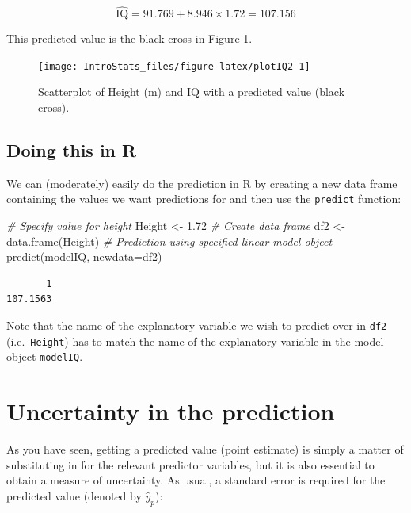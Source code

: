 \documentclass[
  oneside]{krantz}
\newenvironment{Shaded}{\begin{snugshade}}{\end{snugshade}}
\newcommand{\AttributeTok}[1]{\textcolor[rgb]{0.77,0.63,0.00}{#1}}
\newcommand{\CommentTok}[1]{\textcolor[rgb]{0.56,0.35,0.01}{\textit{#1}}}
\newcommand{\FloatTok}[1]{\textcolor[rgb]{0.00,0.00,0.81}{#1}}
\newcommand{\FunctionTok}[1]{\textcolor[rgb]{0.00,0.00,0.00}{#1}}
\newcommand{\NormalTok}[1]{#1}
\newcommand{\OtherTok}[1]{\textcolor[rgb]{0.56,0.35,0.01}{#1}}
\begin{document}
\[\hat {\textrm{IQ}} =91.769 + 8.946 \times 1.72 = 107.156\]

This predicted value is the black cross in Figure \ref{fig:plotIQ2}.

\begin{figure}

{\centering \texttt{[image: IntroStats\_files/figure-latex/plotIQ2-1]} 

}

\caption{Scatterplot of Height (m) and IQ with a predicted value (black cross).}\label{fig:plotIQ2}
\end{figure}

\hypertarget{doing-this-in-r-27}{%
\subsection{Doing this in R}\label{doing-this-in-r-27}}

We can (moderately) easily do the prediction in R by creating a new data frame containing the values we want predictions for and then use the \texttt{predict} function:

\begin{Shaded}
\begin{Highlighting}[]
\CommentTok{\# Specify value for height}
\NormalTok{Height }\OtherTok{\textless{}{-}} \FloatTok{1.72}
\CommentTok{\# Create data frame}
\NormalTok{df2 }\OtherTok{\textless{}{-}} \FunctionTok{data.frame}\NormalTok{(Height)}
\CommentTok{\# Prediction using specified linear model object}
\FunctionTok{predict}\NormalTok{(modelIQ, }\AttributeTok{newdata=}\NormalTok{df2)}
\end{Highlighting}
\end{Shaded}

\begin{verbatim}
       1 
107.1563 
\end{verbatim}

Note that the name of the explanatory variable we wish to predict over in \texttt{df2} (i.e.~\texttt{Height}) has to match the name of the explanatory variable in the model object \texttt{modelIQ}.

\hypertarget{uncertainty-in-the-prediction}{%
\section{Uncertainty in the prediction}\label{uncertainty-in-the-prediction}}

As you have seen, getting a predicted value (point estimate) is simply a matter of substituting in for the relevant predictor variables, but it is also essential to obtain a measure of uncertainty. As usual, a standard error is required for the predicted value (denoted by \(\hat y_p\)):
\end{document}
